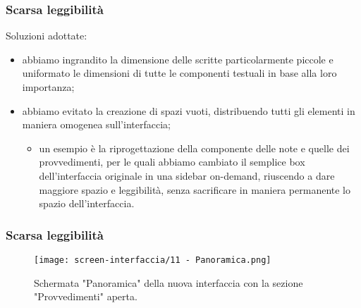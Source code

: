 \begin{frame}
    \label{f:scarsa-leggibilita}
    \frametitle{Scarsa leggibilità}    
    Soluzioni adottate: 
    \begin{itemize}
        \item<1-> abbiamo ingrandito la dimensione delle scritte particolarmente piccole e uniformato le dimensioni di tutte le componenti testuali in base alla loro importanza;
        \item<2-> abbiamo evitato la creazione di spazi vuoti, distribuendo tutti gli elementi in maniera omogenea sull'interfaccia;
        \begin{itemize}
            \item<2-> un esempio è la riprogettazione della componente delle note e quelle dei provvedimenti, per le quali abbiamo cambiato il semplice box dell'interfaccia originale in una sidebar on-demand, riuscendo a dare maggiore spazio e leggibilità, senza sacrificare in maniera permanente lo spazio dell'interfaccia.
        \end{itemize}
    \end{itemize}    

\end{frame}

\begin{frame}
    \frametitle{Scarsa leggibilità}
    \begin{figure}
        \centering
        \texttt{[image: screen-interfaccia/11 - Panoramica.png]}
        \caption{Schermata "Panoramica" della nuova interfaccia con la sezione "Provvedimenti" aperta.}
    \end{figure}
\end{frame}

